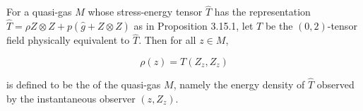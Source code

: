 For a quasi-gas $M$ whose stress-energy tensor $\hat{T}$ has the representation $\hat{T} = \rho Z \otimes Z + p(\hat{g} + Z \otimes Z)$ as in Proposition 3.15.1, let $T$ be the $(0,2)$-tensor field physically equivalent to $\hat{T}$. Then for all $z \in M$,

$$\rho(z) = T(Z_z, Z_z)$$

is defined to be the  of the quasi-gas $M$, namely the energy density of $\hat{T}$ observed by the instantaneous observer $(z, Z_z)$.

